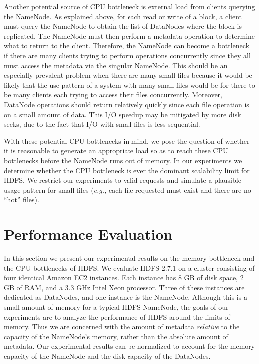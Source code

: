 \documentclass[11pt, a4paper]{article}
\begin{document}
\begin{multicols*}{2}
Another potential source of CPU bottleneck is external load from clients querying the NameNode. As explained above, for each read or write of a block, a client must query the NameNode to obtain the list of DataNodes where the block is replicated. The NameNode must then perform a metadata operation to determine what to return to the client. Therefore, the NameNode can become a bottleneck if there are many clients trying to perform operations concurrently since they all must access the metadata via the singular NameNode. This should be an especially prevalent problem when there are many small files because it would be likely that the use pattern of a system with many small files would be for there to be many clients each trying to access their files concurrently. Moreover, DataNode operations should return relatively quickly since each file operation is on a small amount of data. This I/O speedup may be mitigated by more disk seeks, due to the fact that I/O with small files is less sequential.

With these potential CPU bottlenecks in mind, we pose the question of whether it is reasonable to generate an appropriate load so as to reach these CPU bottlenecks before the NameNode runs out of memory. In our experiments we determine whether the CPU bottleneck is ever the dominant scalability limit for HDFS. We restrict our experiments to valid requests and simulate a plausible usage pattern for small files (\textit{e.g.,} each file requested must exist and there are no ``hot'' files).

\section{Performance Evaluation}
In this section we present our experimental results on the memory bottleneck and the CPU bottlenecks of HDFS. We evaluate HDFS 2.7.1 on a cluster consisting of four identical Amazon EC2 instances. Each instance has 8 GB of disk space, 2 GB of RAM, and a 3.3 GHz Intel Xeon processor. Three of these instances are dedicated as DataNodes, and one instance is the NameNode. Although this is a small amount of memory for a typical HDFS NameNode, the goals of our experiments are to analyze the performance of HDFS around the limits of memory. Thus we are concerned with the amount of metadata \textit{relative} to the capacity of the NameNode's memory, rather than the absolute amount of metadata. Our experimental results can be normalized to account for the memory capacity of the NameNode and the disk capacity of the DataNodes.


\end{multicols*}
\end{document}

